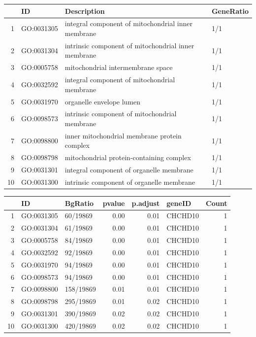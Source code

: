 \begin{table}[ht]
\centering
\begin{tabular}{rlll}
  \hline
 & ID & Description & GeneRatio \\ 
  \hline
1 & GO:0031305 & integral component of mitochondrial inner membrane & 1/1 \\ 
  2 & GO:0031304 & intrinsic component of mitochondrial inner membrane & 1/1 \\ 
  3 & GO:0005758 & mitochondrial intermembrane space & 1/1 \\ 
  4 & GO:0032592 & integral component of mitochondrial membrane & 1/1 \\ 
  5 & GO:0031970 & organelle envelope lumen & 1/1 \\ 
  6 & GO:0098573 & intrinsic component of mitochondrial membrane & 1/1 \\ 
  7 & GO:0098800 & inner mitochondrial membrane protein complex & 1/1 \\ 
  8 & GO:0098798 & mitochondrial protein-containing complex & 1/1 \\ 
  9 & GO:0031301 & integral component of organelle membrane & 1/1 \\ 
  10 & GO:0031300 & intrinsic component of organelle membrane & 1/1 \\ 
   \hline
\end{tabular}
\end{table}

\begin{table}[ht]
\centering
\begin{tabular}{rllrrlr}
  \hline
 & ID & BgRatio & pvalue & p.adjust & geneID & Count \\ 
  \hline
1 & GO:0031305 & 60/19869 & 0.00 & 0.01 & CHCHD10 &   1 \\ 
  2 & GO:0031304 & 61/19869 & 0.00 & 0.01 & CHCHD10 &   1 \\ 
  3 & GO:0005758 & 84/19869 & 0.00 & 0.01 & CHCHD10 &   1 \\ 
  4 & GO:0032592 & 92/19869 & 0.00 & 0.01 & CHCHD10 &   1 \\ 
  5 & GO:0031970 & 94/19869 & 0.00 & 0.01 & CHCHD10 &   1 \\ 
  6 & GO:0098573 & 94/19869 & 0.00 & 0.01 & CHCHD10 &   1 \\ 
  7 & GO:0098800 & 158/19869 & 0.01 & 0.01 & CHCHD10 &   1 \\ 
  8 & GO:0098798 & 295/19869 & 0.01 & 0.02 & CHCHD10 &   1 \\ 
  9 & GO:0031301 & 390/19869 & 0.02 & 0.02 & CHCHD10 &   1 \\ 
  10 & GO:0031300 & 420/19869 & 0.02 & 0.02 & CHCHD10 &   1 \\ 
   \hline
\end{tabular}
\end{table}

